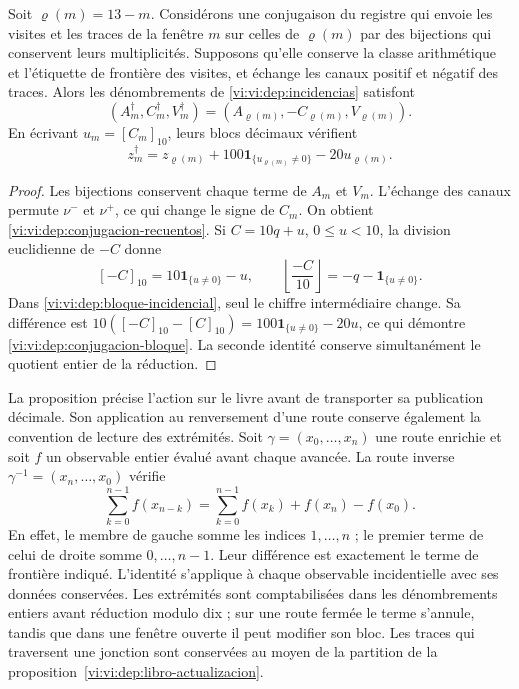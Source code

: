 \begin{proposition}
\label{vi:vi:dep:conjugacion-incidencial}
Soit \(\varrho(m)=13-m\). Considérons une conjugaison du registre
qui envoie les visites et les traces de la fenêtre \(m\) sur celles de
\(\varrho(m)\) par des bijections qui conservent leurs multiplicités.
Supposons qu’elle conserve la classe arithmétique et l’étiquette de frontière
des visites, et échange les canaux positif et négatif des
traces. Alors les dénombrements de \eqref{vi:vi:dep:incidencias} satisfont
\begin{equation}
 (A_m^\dagger,C_m^\dagger,V_m^\dagger)
 =(A_{\varrho(m)},-C_{\varrho(m)},V_{\varrho(m)}).
 \label{vi:vi:dep:conjugacion-recuentos}
\end{equation}
En écrivant \(u_m=[C_m]_{10}\), leurs blocs décimaux vérifient
\begin{equation}
 z_m^\dagger=z_{\varrho(m)}
       +100\mathbf1_{\{u_{\varrho(m)}\ne0\}}-20u_{\varrho(m)}.
 \label{vi:vi:dep:conjugacion-bloque}
\end{equation}
\end{proposition}
\begin{proof}
Les bijections conservent chaque terme de \(A_m\) et \(V_m\).
L’échange des canaux permute \(\nu^-\) et \(\nu^+\),
ce qui change le signe de \(C_m\). On obtient
\eqref{vi:vi:dep:conjugacion-recuentos}. Si \(C=10q+u\),
\(0\le u<10\), la division euclidienne de \(-C\) donne
\[
 [-C]_{10}=10\mathbf1_{\{u\ne0\}}-u,
 \qquad
 \left\lfloor\frac{-C}{10}\right\rfloor
 =-q-\mathbf1_{\{u\ne0\}}.
\]
Dans \eqref{vi:vi:dep:bloque-incidencial}, seul le chiffre
intermédiaire change. Sa différence est
\(10([-C]_{10}-[C]_{10})=100\mathbf1_{\{u\ne0\}}-20u\),
ce qui démontre \eqref{vi:vi:dep:conjugacion-bloque}. La seconde
identité conserve simultanément le quotient entier de la réduction.
\end{proof}

La proposition précise l'action sur le livre avant de transporter
sa publication décimale. Son application au renversement d'une route
conserve également la convention de lecture des extrémités. Soit
\(\gamma=(x_0,\ldots,x_n)\) une route enrichie et soit \(f\) un
observable entier évalué avant chaque avancée. La route inverse
\(\gamma^{-1}=(x_n,\ldots,x_0)\) vérifie
\begin{equation}
 \sum_{k=0}^{n-1}f(x_{n-k})
 =\sum_{k=0}^{n-1}f(x_k)+f(x_n)-f(x_0).
 \label{vi:vi:dep:conjugacion-frontera}
\end{equation}
En effet, le membre de gauche somme les indices \(1,\ldots,n\) ;
le premier terme de celui de droite somme \(0,\ldots,n-1\). Leur différence
est exactement le terme de frontière indiqué. L’identité s’applique
à chaque observable incidentielle avec ses données conservées. Les extrémités
sont comptabilisées dans les dénombrements entiers avant réduction modulo dix ;
sur une route fermée le terme s’annule, tandis que dans une fenêtre
ouverte il peut modifier son bloc. Les traces qui traversent une jonction
sont conservées au moyen de la partition de la
proposition~\ref{vi:vi:dep:libro-actualizacion}.

